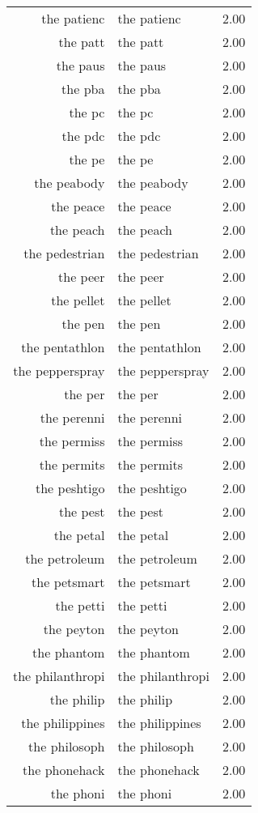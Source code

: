 \begin{table}[ht]
\begin{tabular}{rlr}
  the patienc & the patienc & 2.00 \\ 
  the patt & the patt & 2.00 \\ 
  the paus & the paus & 2.00 \\ 
  the pba & the pba & 2.00 \\ 
  the pc & the pc & 2.00 \\ 
  the pdc & the pdc & 2.00 \\ 
  the pe & the pe & 2.00 \\ 
  the peabody & the peabody & 2.00 \\ 
  the peace & the peace & 2.00 \\ 
  the peach & the peach & 2.00 \\ 
  the pedestrian & the pedestrian & 2.00 \\ 
  the peer & the peer & 2.00 \\ 
  the pellet & the pellet & 2.00 \\ 
  the pen & the pen & 2.00 \\ 
  the pentathlon & the pentathlon & 2.00 \\ 
  the pepperspray & the pepperspray & 2.00 \\ 
  the per & the per & 2.00 \\ 
  the perenni & the perenni & 2.00 \\ 
  the permiss & the permiss & 2.00 \\ 
  the permits & the permits & 2.00 \\ 
  the peshtigo & the peshtigo & 2.00 \\ 
  the pest & the pest & 2.00 \\ 
  the petal & the petal & 2.00 \\ 
  the petroleum & the petroleum & 2.00 \\ 
  the petsmart & the petsmart & 2.00 \\ 
  the petti & the petti & 2.00 \\ 
  the peyton & the peyton & 2.00 \\ 
  the phantom & the phantom & 2.00 \\ 
  the philanthropi & the philanthropi & 2.00 \\ 
  the philip & the philip & 2.00 \\ 
  the philippines & the philippines & 2.00 \\ 
  the philosoph & the philosoph & 2.00 \\ 
  the phonehack & the phonehack & 2.00 \\ 
  the phoni & the phoni & 2.00 \\ 

\end{tabular}
\end{table}
